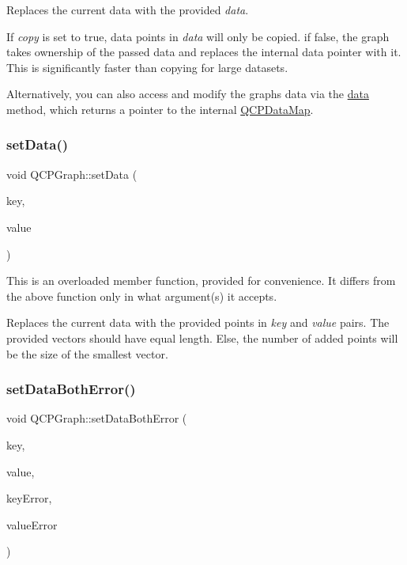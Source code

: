 Replaces the current data with the provided {\itshape data}.

If {\itshape copy} is set to true, data points in {\itshape data} will only be copied. if false, the graph takes ownership of the passed data and replaces the internal data pointer with it. This is significantly faster than copying for large datasets.

Alternatively, you can also access and modify the graph\textquotesingle{}s data via the \mbox{\hyperlink{class_q_c_p_graph_acde1c0d1f6a817930489548396e6b3e6}{data}} method, which returns a pointer to the internal \mbox{\hyperlink{qcustomplot_8h_a84a9c4a4c2216ccfdcb5f3067cda76e3}{Q\+C\+P\+Data\+Map}}. \mbox{\label{class_q_c_p_graph_a4c55d8ac13bfa42c8c93747820891a76}} 
\subsubsection{\texorpdfstring{set\+Data()}{setData()}\hspace{0.1cm}{\footnotesize\ttfamily [2/2]}}
{\footnotesize\ttfamily void Q\+C\+P\+Graph\+::set\+Data (\begin{DoxyParamCaption}\item[{const Q\+Vector$<$ double $>$ \&}]{key,  }\item[{const Q\+Vector$<$ double $>$ \&}]{value }\end{DoxyParamCaption})}

This is an overloaded member function, provided for convenience. It differs from the above function only in what argument(s) it accepts.

Replaces the current data with the provided points in {\itshape key} and {\itshape value} pairs. The provided vectors should have equal length. Else, the number of added points will be the size of the smallest vector. \mbox{\label{class_q_c_p_graph_a873fe46bdb20be5710428e474ade8908}} 
\subsubsection{\texorpdfstring{set\+Data\+Both\+Error()}{setDataBothError()}\hspace{0.1cm}{\footnotesize\ttfamily [1/2]}}
{\footnotesize\ttfamily void Q\+C\+P\+Graph\+::set\+Data\+Both\+Error (\begin{DoxyParamCaption}\item[{const Q\+Vector$<$ double $>$ \&}]{key,  }\item[{const Q\+Vector$<$ double $>$ \&}]{value,  }\item[{const Q\+Vector$<$ double $>$ \&}]{key\+Error,  }\item[{const Q\+Vector$<$ double $>$ \&}]{value\+Error }\end{DoxyParamCaption})}

